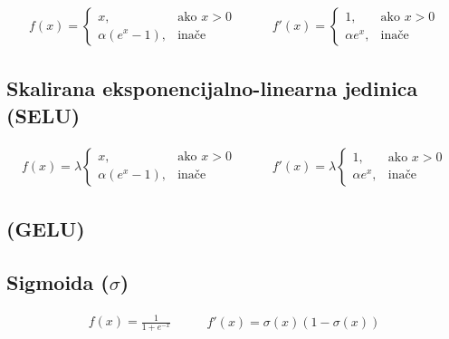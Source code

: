 \documentclass[times, utf8, diplomski]{fer}
\begin{document}
\begin{equation}
\begin{split}
f(x) = 
\begin{cases}
x,					& \text{ako } x > 0 \\
\alpha (e^x - 1),	&  \text{inače}
\end{cases}
\end{split}
\qquad
\begin{split}
f'(x) = 
\begin{cases}
1,	 		& \text{ako } x > 0 \\
\alpha e^x,	& \text{inače}
\end{cases}
\end{split}
\end{equation}

\subsection*{Skalirana eksponencijalno-linearna jedinica (SELU)}

\begin{equation}
\begin{split}
f(x) = \lambda
\begin{cases}
x,					& \text{ako } x > 0 \\
\alpha (e^x - 1),	&  \text{inače}
\end{cases}
\end{split}
\qquad
\begin{split}
f'(x) = \lambda
\begin{cases}
1,	 		& \text{ako } x > 0 \\
\alpha e^x,	& \text{inače}
\end{cases}
\end{split}
\end{equation}

\subsection*{(GELU)}

\subsection*{Sigmoida ($\sigma $)}

\begin{equation}
\begin{split}
f(x) = \frac{1}{1+e^{-x}}
\end{split}
\qquad
\begin{split}
f'(x) = \sigma(x)(1-\sigma(x))
\end{split}
\end{equation}
\end{document}
